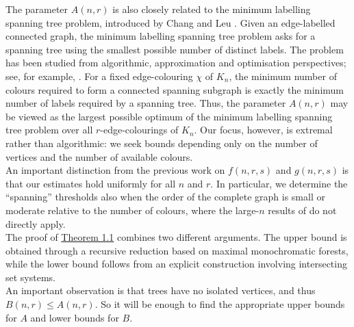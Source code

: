 \documentclass[11pt,a4paper]{article}
\begin{document}
\noindent
The parameter $A(n,r)$ is also closely related to the minimum labelling spanning tree problem, introduced by Chang and Leu \cite{ChangLeu1997}. Given an edge-labelled connected graph, the minimum labelling spanning tree problem asks for a spanning tree using the smallest possible number of distinct labels. The problem has been studied from algorithmic, approximation and optimisation perspectives; see, for example, \cite{KrumkeWirth1998}. For a fixed edge-colouring $\chi$ of $K_n$, the minimum number of colours required to form a connected spanning subgraph is exactly the minimum number of labels required by a spanning tree. Thus, the parameter $A(n,r)$ may be viewed as the largest possible optimum of the minimum labelling spanning tree problem over all $r$-edge-colourings of $K_n$. Our focus, however, is extremal rather than algorithmic: we seek bounds depending only on the number of vertices and the number of available colours.  \\

\noindent
An important distinction from the previous work on $f(n,r,s)$ and $g(n,r,s)$ is that our estimates hold uniformly for all $n$ and $r$. In particular, we determine the ``spanning'' thresholds also when the order of the complete graph is small or moderate relative to the number of colours, where the large-$n$ results of \cite{ABCK2024} do not directly apply. \\

\noindent
The proof of \hyperref[thm:1:1]{Theorem 1.1} combines two different arguments. The upper bound is obtained through a recursive reduction based on maximal monochromatic forests, while the lower bound follows from an explicit construction involving intersecting set systems. \\

\noindent
An important observation is that trees have no isolated vertices, and thus $B(n,r) \leq A(n,r)$. So it will be enough to find the appropriate upper bounds for $A$ and lower bounds for $B$.
\end{document}
